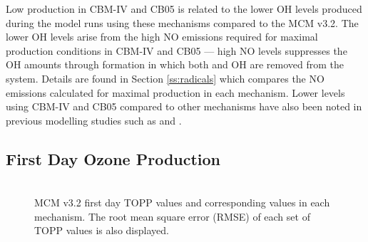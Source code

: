 Low  production in CBM-IV and CB05 is related to the lower OH levels produced during the model runs using these mechanisms compared to the MCM v3.2. 
The lower OH levels arise from the high NO emissions required for maximal  production conditions in CBM-IV and CB05 --- high NO levels suppresses the OH amounts through  formation  in which both  and OH are removed from the system.
Details are found in Section \ref{ss:radicals} which compares the NO emissions calculated for maximal  production in each mechanism.
Lower  levels using CBM-IV and CB05 compared to other mechanisms have also been noted in previous modelling studies such as \citet{Luecken:2008, Emmerson:2009} and \citet{Saylor:2012}.

\subsection{First Day Ozone Production} \label{ss:day1} %

\begin{figure}
    \centering
    \includegraphics[width=\textwidth]{img/first_day_values}
    \vspace{1mm}
    \caption{MCM v3.2 first day TOPP values and corresponding values in each mechanism. The root mean square error (RMSE) of each set of TOPP values is also displayed.}
    \vspace{-4mm}
    \label{f:first_day}
\end{figure}

